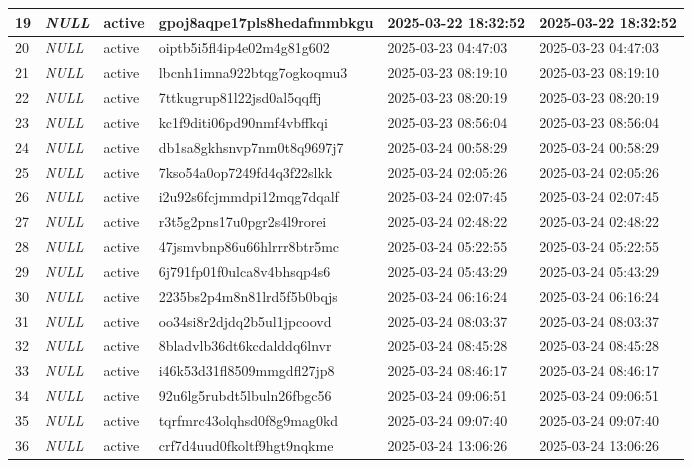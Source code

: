 \begin{longtable}{|l|l|l|l|l|l|}
19 & \textit{NULL} & active & gpoj8aqpe17pls8hedafmmbkgu & 2025-03-22 18:32:52 & 2025-03-22 18:32:52 \\ \hline 
20 & \textit{NULL} & active & oiptb5i5fl4ip4e02m4g81g602 & 2025-03-23 04:47:03 & 2025-03-23 04:47:03 \\ \hline 
21 & \textit{NULL} & active & lbcnh1imna922btqg7ogkoqmu3 & 2025-03-23 08:19:10 & 2025-03-23 08:19:10 \\ \hline 
22 & \textit{NULL} & active & 7ttkugrup81l22jsd0al5qqffj & 2025-03-23 08:20:19 & 2025-03-23 08:20:19 \\ \hline 
23 & \textit{NULL} & active & kc1f9diti06pd90nmf4vbffkqi & 2025-03-23 08:56:04 & 2025-03-23 08:56:04 \\ \hline 
24 & \textit{NULL} & active & db1sa8gkhsnvp7nm0t8q9697j7 & 2025-03-24 00:58:29 & 2025-03-24 00:58:29 \\ \hline 
25 & \textit{NULL} & active & 7kso54a0op7249fd4q3f22slkk & 2025-03-24 02:05:26 & 2025-03-24 02:05:26 \\ \hline 
26 & \textit{NULL} & active & i2u92s6fcjmmdpi12mqg7dqalf & 2025-03-24 02:07:45 & 2025-03-24 02:07:45 \\ \hline 
27 & \textit{NULL} & active & r3t5g2pns17u0pgr2s4l9rorei & 2025-03-24 02:48:22 & 2025-03-24 02:48:22 \\ \hline 
28 & \textit{NULL} & active & 47jsmvbnp86u66hlrrr8btr5mc & 2025-03-24 05:22:55 & 2025-03-24 05:22:55 \\ \hline 
29 & \textit{NULL} & active & 6j791fp01f0ulca8v4bhsqp4s6 & 2025-03-24 05:43:29 & 2025-03-24 05:43:29 \\ \hline 
30 & \textit{NULL} & active & 2235bs2p4m8n81lrd5f5b0bqjs & 2025-03-24 06:16:24 & 2025-03-24 06:16:24 \\ \hline 
31 & \textit{NULL} & active & oo34si8r2djdq2b5ul1jpcoovd & 2025-03-24 08:03:37 & 2025-03-24 08:03:37 \\ \hline 
32 & \textit{NULL} & active & 8bladvlb36dt6kcdalddq6lnvr & 2025-03-24 08:45:28 & 2025-03-24 08:45:28 \\ \hline 
33 & \textit{NULL} & active & i46k53d31fl8509mmgdfl27jp8 & 2025-03-24 08:46:17 & 2025-03-24 08:46:17 \\ \hline 
34 & \textit{NULL} & active & 92u6lg5rubdt5lbuln26fbgc56 & 2025-03-24 09:06:51 & 2025-03-24 09:06:51 \\ \hline 
35 & \textit{NULL} & active & tqrfmrc43olqhsd0f8g9mag0kd & 2025-03-24 09:07:40 & 2025-03-24 09:07:40 \\ \hline 
36 & \textit{NULL} & active & crf7d4uud0fkoltf9hgt9nqkme & 2025-03-24 13:06:26 & 2025-03-24 13:06:26 \\ \hline 

\end{longtable}
